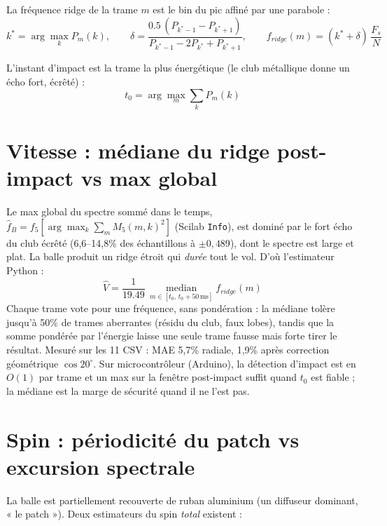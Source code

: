 \documentclass[10pt,a4paper]{report}
\begin{document}
La fréquence ridge de la trame $m$ est le bin du pic affiné par une parabole :
\begin{equation}
k^* = \arg\max_k P_m(k), \qquad
\delta = \frac{0.5\,(P_{k^*-1}-P_{k^*+1})}{P_{k^*-1}-2P_{k^*}+P_{k^*+1}}, \qquad
f_{ridge}(m) = (k^*+\delta)\,\frac{F_s}{N}
\end{equation}

L'instant d'impact est la trame la plus énergétique (le club métallique donne un écho fort, écrêté) :
\begin{equation}
t_0 = \arg\max_m \sum_k P_m(k)
\end{equation}

\section{Vitesse : médiane du ridge post-impact vs max global}

Le max global du spectre sommé dans le temps, $\hat f_B = f_5[\arg\max_k \sum_m M_5(m,k)^2]$ (Scilab \texttt{Info}), est dominé par le fort écho du club écrêté (6,6--14,8\% des échantillons à $\pm0{,}489$), dont le spectre est large et plat. La balle produit un ridge étroit qui \emph{durée} tout le vol. D'où l'estimateur Python :
\begin{equation}
\hat V = \frac{1}{19.49}\,\operatorname*{median}_{m\in[t_0,\,t_0+50\,\text{ms}]} f_{ridge}(m)
\end{equation}
Chaque trame vote pour une fréquence, sans pondération : la médiane tolère jusqu'à 50\% de trames aberrantes (résidu du club, faux lobes), tandis que la somme pondérée par l'énergie laisse une seule trame fausse mais forte tirer le résultat. Mesuré sur les 11 CSV : MAE 5,7\% radiale, 1,9\% après correction géométrique $\cos 20^\circ$. Sur microcontrôleur (Arduino), la détection d'impact est en $O(1)$ par trame et un max sur la fenêtre post-impact suffit quand $t_0$ est fiable ; la médiane est la marge de sécurité quand il ne l'est pas.

\section{Spin : périodicité du patch vs excursion spectrale}

La balle est partiellement recouverte de ruban aluminium (un diffuseur dominant, « le patch »). Deux estimateurs du spin \emph{total} existent :
\end{document}
